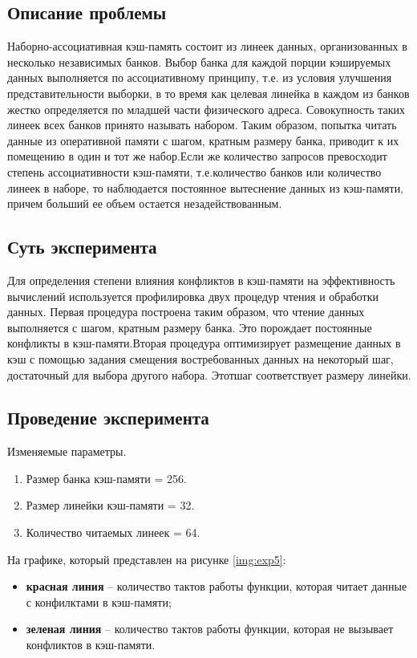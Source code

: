 \subsection{Описание проблемы}
Наборно-ассоциативная кэш-память состоит из линеек данных, организованных в несколько независимых банков. Выбор банка для каждой порции кэшируемых данных выполняется по ассоциативному принципу, т.е. из условия улучшения представительности выборки, в то время как целевая линейка в каждом из банков жестко определяется по младшей части физического адреса. Совокупность таких линеек всех банков принято называть набором. Таким образом, попытка читать данные из оперативной памяти с шагом, кратным размеру банка, приводит к их помещению в один и тот же набор.Если же количество запросов превосходит степень ассоциативности кэш-памяти, т.е.количество банков или количество линеек в наборе, то наблюдается постоянное вытеснение данных из кэш-памяти, причем больший ее объем  остается незадействованным.

\subsection{Суть эксперимента}  
Для определения степени влияния конфликтов в кэш-памяти на эффективность вычислений используется профилировка двух процедур чтения и обработки данных. Первая процедура построена таким образом, что чтение данных выполняется с шагом, кратным размеру банка. Это порождает постоянные конфликты в кэш-памяти.Вторая процедура оптимизирует размещение данных в кэш с помощью задания смещения востребованных данных на некоторый шаг, достаточный для выбора другого набора. Этотшаг соответствует размеру линейки.  


\subsection{Проведение эксперимента}

Изменяемые параметры.

\begin{enumerate}
	\item Размер банка кэш-памяти = 256.
	\item Размер линейки кэш-памяти = 32.
	\item Количество читаемых линеек = 64.
\end{enumerate}

На графике, который представлен на рисунке \ref{img:exp5}:
\begin{itemize}
	\item \textbf{красная линия} -- количество тактов работы функции, которая читает данные с конфилктами в кэш-памяти;
	\item \textbf{зеленая линия} -- количество тактов работы функции, которая не вызывает конфликтов в кэш-памяти.
\end{itemize}

